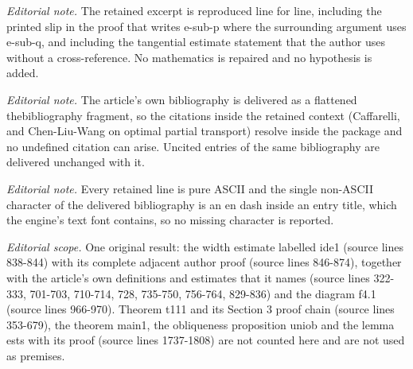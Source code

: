 \documentclass[10pt,a4paper]{amsart}
\theoremstyle{plain}
\newcommand{\0}{\textbf{0}}
\numberwithin{equation}{section}
\numberwithin{equation}{section}
\numberwithin{figure}{section}
\begin{document}
\noindent\textit{Editorial note.} The retained excerpt is reproduced line for line, including the printed slip in the proof that writes e-sub-p where the surrounding argument uses e-sub-q, and including the tangential estimate statement that the author uses without a cross-reference. No mathematics is repaired and no hypothesis is added.\par\medskip
\noindent\textit{Editorial note.} The article's own bibliography is delivered as a flattened thebibliography fragment, so the citations inside the retained context (Caffarelli, and Chen-Liu-Wang on optimal partial transport) resolve inside the package and no undefined citation can arise. Uncited entries of the same bibliography are delivered unchanged with it.\par\medskip
\noindent\textit{Editorial note.} Every retained line is pure ASCII and the single non-ASCII character of the delivered bibliography is an en dash inside an entry title, which the engine's text font contains, so no missing character is reported.\par\medskip
\noindent\textit{Editorial scope.} One original result: the width estimate labelled ide1 (source lines 838-844) with its complete adjacent author proof (source lines 846-874), together with the article's own definitions and estimates that it names (source lines 322-333, 701-703, 710-714, 728, 735-750, 756-764, 829-836) and the diagram f4.1 (source lines 966-970). Theorem t111 and its Section 3 proof chain (source lines 353-679), the theorem main1, the obliqueness proposition uniob and the lemma ests with its proof (source lines 1737-1808) are not counted here and are not used as premises.\par\medskip
\end{document}
